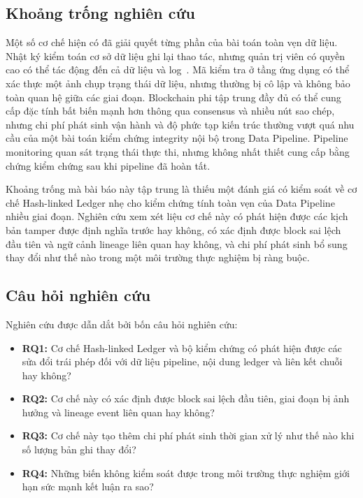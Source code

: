 \subsection{Khoảng trống nghiên
cứu}\label{sec:khoangtrong}

Một số cơ chế hiện có đã giải quyết từng phần của bài toán toàn vẹn dữ
liệu. Nhật ký kiểm toán cơ sở dữ liệu ghi lại thao tác, nhưng quản trị viên có quyền
cao có thể tác động đến cả dữ liệu và log~\citep{schneierKelsey1998}. Mã kiểm tra ở tầng ứng dụng có
thể xác thực một ảnh chụp trạng thái dữ liệu, nhưng thường bị cô lập và không bảo
toàn quan hệ giữa các giai đoạn. Blockchain phi tập trung đầy đủ có thể cung
cấp đặc tính bất biến mạnh hơn thông qua consensus và nhiều nút sao
chép, nhưng chi phí phát sinh vận hành và độ phức tạp kiến trúc thường vượt quá
nhu cầu của một bài toán kiểm chứng integrity nội bộ trong Data
Pipeline. Pipeline monitoring quan sát trạng thái thực thi, nhưng không
nhất thiết cung cấp bằng chứng kiểm chứng sau khi pipeline đã hoàn tất.

Khoảng trống mà bài báo này tập trung là thiếu một đánh giá có kiểm soát
về cơ chế Hash-linked Ledger nhẹ cho kiểm chứng tính toàn vẹn của Data
Pipeline nhiều giai đoạn. Nghiên cứu xem xét liệu cơ chế này có phát hiện
được các kịch bản tamper được định nghĩa trước hay không, có xác định
được block sai lệch đầu tiên và ngữ cảnh lineage liên quan hay không, và
chi phí phát sinh bổ sung thay đổi như thế nào trong một môi trường thực nghiệm
bị ràng buộc.

\subsection{Câu hỏi nghiên
cứu}\label{sec:cauhoi}

Nghiên cứu được dẫn dắt bởi bốn câu hỏi nghiên cứu:

\begin{itemize}
\item
  \textbf{RQ1:} Cơ chế Hash-linked Ledger và bộ kiểm chứng có phát hiện
  được các sửa đổi trái phép đối với dữ liệu pipeline, nội dung ledger và
  liên kết chuỗi hay không?
\item
  \textbf{RQ2:} Cơ chế này có xác định được block sai lệch đầu tiên, giai đoạn bị
  ảnh hưởng và lineage event liên quan hay không?
\item
  \textbf{RQ3:} Cơ chế này tạo thêm chi phí phát sinh thời gian xử lý như thế nào
  khi số lượng bản ghi thay đổi?
\item
  \textbf{RQ4:} Những biến không kiểm soát được trong môi trường thực
  nghiệm giới hạn sức mạnh kết luận ra sao?
\end{itemize}

